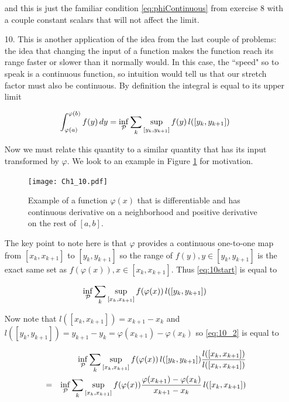 \documentclass[oneside]{book}
\begin{document}
\begin{enumerate}
and this is just the familiar condition \ref{eq:phiContinuous} from exercise 8 with a couple constant scalars that will not affect the limit.

\item[10.] This is another application of the idea from the last couple of problems: the idea that changing the input of a function makes the function reach its range faster or slower than it normally would. In this case, the ``speed" so to speak is a continuous function, so intuition would tell us that our stretch factor must also be continuous. By definition the integral is equal to its upper limit

\begin{eqnarray}
\label{eq:10start}
\int_{\varphi(a)}^{\varphi(b)} f(y)\,dy = \inf_{\cal{P}} \sum_k \sup_{[y_k,y_{k+1}]} f(y)\,l([y_k,y_{k+1}])
\end{eqnarray}

Now we must relate this quantity to a similar quantity that has its input transformed by $\varphi$. We look to an example in Figure \ref{fig:varPhiEx} for motivation.

\begin{figure}[h]
    \centering
    \texttt{[image: Ch1\_10.pdf]}
    \caption{Example of a function $\varphi(x)$ that is differentiable and has continuous derivative on a neighborhood and positive derivative on the rest of $[a,b]$.}
    \label{fig:varPhiEx}
\end{figure}

The key point to note here is that $\varphi$ provides a continuous one-to-one map from $[x_k,x_{k+1}]$ to $[y_k,y_{k+1}]$ so the range of $f(y), y \in [y_k,y_{k+1}]$ is the exact same set as $f(\varphi(x)), x \in [x_k,x_{k+1}]$. Thus \ref{eq:10start} is equal to

\begin{eqnarray}
\label{eq:10_2}
\inf_{\cal{P}} \sum_k \sup_{[x_k,x_{k+1}]} f(\varphi(x))\,l([y_k,y_{k+1}])
\end{eqnarray}

Now note that $l([x_k,x_{k+1}]) = x_{k+1}-x_k$ and $l([y_k,y_{k+1}]) = y_{k+1}-y_k=\varphi(x_{k+1})-\varphi(x_k)$ so \ref{eq:10_2} is equal to

\begin{eqnarray}
\label{eq:10almost}
&&\inf_{\cal{P}} \sum_k \sup_{[x_k,x_{k+1}]} f(\varphi(x))\,l([y_k,y_{k+1}]) \frac{l([x_k,x_{k+1}])}{l([x_k,x_{k+1}]) } \nonumber \\
&=& \inf_{\cal{P}} \sum_k \sup_{[x_k,x_{k+1}]} f(\varphi(x))  \frac{\varphi(x_{k+1})-\varphi(x_k)}{x_{k+1}-x_k} \,l([x_k,x_{k+1}])
\end{eqnarray}


\end{enumerate}
\end{document}
